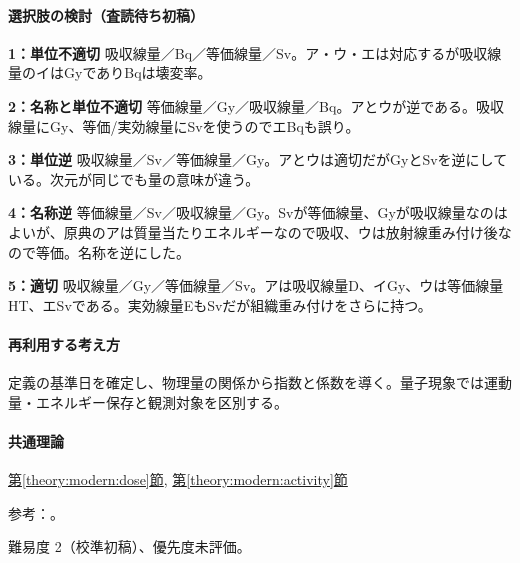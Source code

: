 \paragraph{選択肢の検討（査読待ち初稿）}\mbox{}\par

\noindent\textbf{1：単位不適切} 吸収線量／Bq／等価線量／Sv。ア・ウ・エは対応するが吸収線量のイはGyでありBqは壊変率。\par

\noindent\textbf{2：名称と単位不適切} 等価線量／Gy／吸収線量／Bq。アとウが逆である。吸収線量にGy、等価/実効線量にSvを使うのでエBqも誤り。\par

\noindent\textbf{3：単位逆} 吸収線量／Sv／等価線量／Gy。アとウは適切だがGyとSvを逆にしている。次元が同じでも量の意味が違う。\par

\noindent\textbf{4：名称逆} 等価線量／Sv／吸収線量／Gy。Svが等価線量、Gyが吸収線量なのはよいが、原典のアは質量当たりエネルギーなので吸収、ウは放射線重み付け後なので等価。名称を逆にした。\par

\noindent\textbf{5：適切} 吸収線量／Gy／等価線量／Sv。アは吸収線量D、イGy、ウは等価線量HT、エSvである。実効線量EもSvだが組織重み付けをさらに持つ。\par

\paragraph{再利用する考え方} 定義の基準日を確定し、物理量の関係から指数と係数を導く。量子現象では運動量・エネルギー保存と観測対象を区別する。

\paragraph{共通理論} \hyperref[theory:modern:dose]{第\ref*{theory:modern:dose}節}, \hyperref[theory:modern:activity]{第\ref*{theory:modern:activity}節}

\par 参考：\cite{modern_dose,si_brochure9}。

\par 難易度 2（校準初稿）、優先度未評価。
